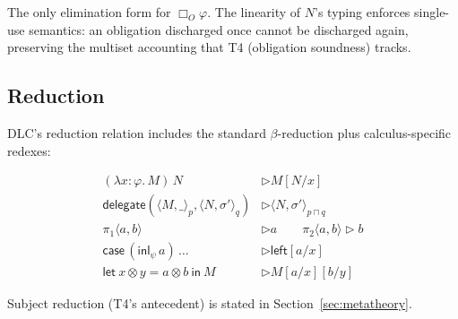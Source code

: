 The only elimination form for $\Box_O \varphi$.  The linearity of $N$'s
typing enforces single-use semantics: an obligation discharged once
cannot be discharged again, preserving the multiset accounting that
T4 (obligation soundness) tracks.

\subsection{Reduction}

DLC's reduction relation includes the standard $\beta$-reduction plus
calculus-specific redexes:

\begin{align*}
(\lambda x{:}\varphi.\,M)\,N &\rhd M[N/x] \\
\mathsf{delegate}(\langle M, \_ \rangle_p, \langle N, \sigma' \rangle_q)
&\rhd \langle N, \sigma' \rangle_{p \sqcap q} \\
\pi_1 \langle a, b \rangle &\rhd a \qquad \pi_2 \langle a, b \rangle \rhd b \\
\mathsf{case}\,(\mathsf{inl}_\psi\,a)\,\ldots &\rhd \mathsf{left}[a/x] \\
\mathsf{let}~x \otimes y = a \otimes b~\mathsf{in}~M &\rhd M[a/x][b/y]
\end{align*}

Subject reduction (T4's antecedent) is stated in Section~\ref{sec:metatheory}.
